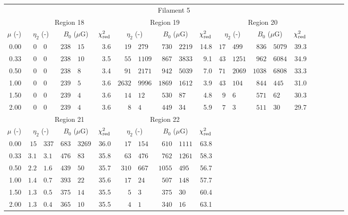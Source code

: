 \begin{tabular}{@{}r r@{ $\pm$ }lr@{ $\pm$ }lr
                     r@{ $\pm$ }lr@{ $\pm$ }lr
                     r@{ $\pm$ }lr@{ $\pm$ }lr
                     r@{ $\pm$ }lr@{ $\pm$ }lr@{}}
\midrule
\multicolumn{21}{c}{Filament 5} \\
\cmidrule{1-21}
{} & \multicolumn{5}{c}{Region 18}
   & \multicolumn{5}{c}{Region 19}
   & \multicolumn{5}{c}{Region 20} \\
\cmidrule(lr){2-6} \cmidrule(lr){7-11} \cmidrule(lr){12-16}
$\mu$ (-) & \multicolumn{2}{c}{$\eta_2$ (-)}
          & \multicolumn{2}{c}{$B_0$ ($\mu$G)} & $\chi^2_{\mathrm{red}}$
          & \multicolumn{2}{c}{$\eta_2$ (-)}
          & \multicolumn{2}{c}{$B_0$ ($\mu$G)} & $\chi^2_{\mathrm{red}}$
          & \multicolumn{2}{c}{$\eta_2$ (-)}
          & \multicolumn{2}{c}{$B_0$ ($\mu$G)} & $\chi^2_{\mathrm{red}}$ \\
\cmidrule{1-16}
0.00 & $0$ & $0$ & $238$ & $15$ & 3.6
     & $19$ & $279$ & $730$ & $2219$ & 14.8
     & $17$ & $499$ & $836$ & $5079$ & 39.3 \\
0.33 & $0$ & $0$ & $238$ & $10$ & 3.5
     & $55$ & $1109$ & $867$ & $3833$ & 9.1
     & $43$ & $1251$ & $962$ & $6084$ & 34.9 \\
0.50 & $0$ & $0$ & $238$ & $8$ & 3.4
     & $91$ & $2171$ & $942$ & $5039$ & 7.0
     & $71$ & $2069$ & $1038$ & $6808$ & 33.3 \\
1.00 & $0$ & $0$ & $239$ & $5$ & 3.6
     & $2632$ & $9996$ & $1869$ & $1612$ & 3.9
     & $43$ & $104$ & $844$ & $445$ & 31.0 \\
1.50 & $0$ & $0$ & $239$ & $4$ & 3.6
     & $14$ & $12$ & $530$ & $87$ & 4.8
     & $9$ & $6$ & $571$ & $62$ & 30.3 \\
2.00 & $0$ & $0$ & $239$ & $4$ & 3.6
     & $8$ & $4$ & $449$ & $34$ & 5.9
     & $7$ & $3$ & $511$ & $30$ & 29.7 \\

\cmidrule{1-21}
{} & \multicolumn{5}{c}{Region 21}
   & \multicolumn{5}{c}{Region 22} \\
\cmidrule(lr){2-6} \cmidrule(lr){7-11}
$\mu$ (-) & \multicolumn{2}{c}{$\eta_2$ (-)}
          & \multicolumn{2}{c}{$B_0$ ($\mu$G)} & $\chi^2_{\mathrm{red}}$
          & \multicolumn{2}{c}{$\eta_2$ (-)}
          & \multicolumn{2}{c}{$B_0$ ($\mu$G)} & $\chi^2_{\mathrm{red}}$ \\
\cmidrule{1-11}
0.00 & $15$ & $337$ & $683$ & $3269$ & 36.0
     & $17$ & $154$ & $610$ & $1111$ & 63.8 \\
0.33 & $3.1$ & $3.1$ & $476$ & $83$ & 35.8
     & $63$ & $476$ & $762$ & $1261$ & 58.3 \\
0.50 & $2.2$ & $1.6$ & $439$ & $50$ & 35.7
     & $310$ & $667$ & $1055$ & $495$ & 56.7 \\
1.00 & $1.4$ & $0.7$ & $393$ & $22$ & 35.6
     & $17$ & $24$ & $507$ & $148$ & 57.7 \\
1.50 & $1.3$ & $0.5$ & $375$ & $14$ & 35.5
     & $5$ & $3$ & $375$ & $30$ & 60.4 \\
2.00 & $1.3$ & $0.4$ & $365$ & $10$ & 35.5
     & $4$ & $1$ & $340$ & $16$ & 63.1 \\
\bottomrule
\end{tabular}

